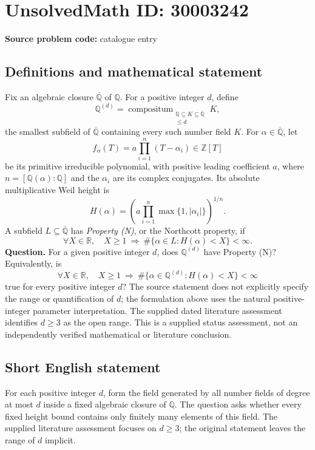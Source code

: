 \documentclass[11pt]{article}
\newcommand{\Z}{\mathbb{Z}}
\newcommand{\Q}{\mathbb{Q}}
\newcommand{\R}{\mathbb{R}}
\begin{document}
\section*{UnsolvedMath ID: 30003242}
\textbf{Source problem code:} catalogue entry
\subsection{Definitions and mathematical statement}
Fix an algebraic closure \(\overline{\Q}\) of \(\Q\). For a positive integer \(d\), define
\[
\Q^{(d)}=\mathop{\mathrm{compositum}}_{\substack{\Q\subseteq K\subseteq\overline{\Q}\\[K:\Q]\leq d}}K,
\]
the smallest subfield of \(\overline{\Q}\) containing every such number field \(K\).
For \(\alpha\in\overline{\Q}\), let
\[
f_\alpha(T)=a\prod_{i=1}^{n}(T-\alpha_i)\in\Z[T]
\]
be its primitive irreducible polynomial, with positive leading coefficient \(a\), where \(n=[\Q(\alpha):\Q]\) and the \(\alpha_i\) are its complex conjugates. Its absolute multiplicative Weil height is
\[
H(\alpha)=\left(a\prod_{i=1}^{n}\max\{1,|\alpha_i|\}\right)^{1/n}.
\]
A subfield \(L\subseteq\overline{\Q}\) has \emph{Property (N)}, or the Northcott property, if
\[
\forall X\in\R,\quad X\geq1\ \Longrightarrow\ \#\{\alpha\in L:H(\alpha)<X\}<\infty.
\]
\textbf{Question.} For a given positive integer \(d\), does \(\Q^{(d)}\) have Property (N)? Equivalently, is
\[
\forall X\in\R,\quad X\geq1\ \Longrightarrow\ \#\{\alpha\in\Q^{(d)}:H(\alpha)<X\}<\infty
\]
true for every positive integer \(d\)?
The source statement does not explicitly specify the range or quantification of \(d\); the formulation above uses the natural positive-integer parameter interpretation. The supplied dated literature assessment identifies \(d\geq3\) as the open range. This is a supplied status assessment, not an independently verified mathematical or literature conclusion.
\subsection{Short English statement}
For each positive integer \(d\), form the field generated by all number fields of degree at most \(d\) inside a fixed algebraic closure of \(\Q\). The question asks whether every fixed height bound contains only finitely many elements of this field. The supplied literature assessment focuses on \(d\geq3\); the original statement leaves the range of \(d\) implicit.
\end{document}
